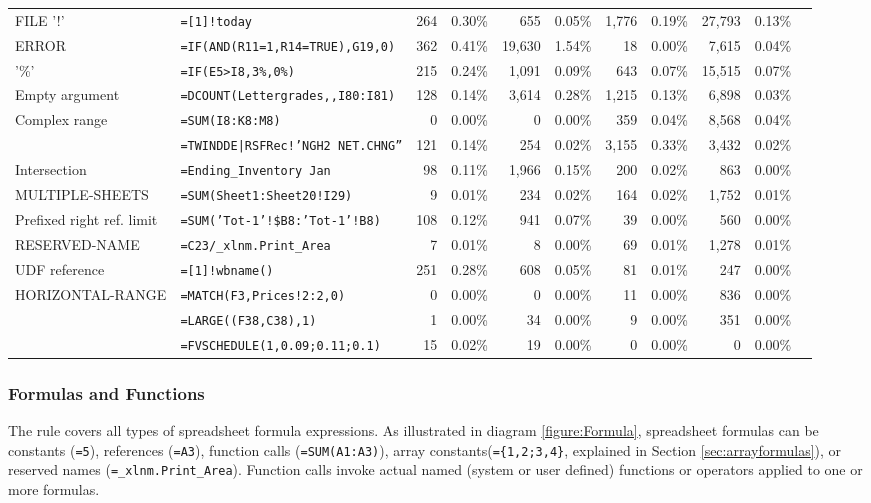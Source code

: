 \documentclass[conference]{IEEEtran}
\begin{document}
\begin{table*}
\begin{tabular}{llrrrrrrrrr}
		FILE '!' & \texttt{=[1]!today} & 264 & 0.30\% & 655 & 0.05\% & 1,776 & 0.19\% & 27,793 & 0.13\%\\
		ERROR & \texttt{=IF(AND(R11=1,R14=TRUE),G19,0)} & 362 & 0.41\% & 19,630 & 1.54\% & 18 & 0.00\% & 7,615 & 0.04\%\\
		'\%' & \texttt{=IF(E5>I8,3\%,0\%)} & 215 & 0.24\% & 1,091 & 0.09\% & 643 & 0.07\% & 15,515 & 0.07\%\\
		Empty argument & \texttt{=DCOUNT(Lettergrades,,I80:I81)} & 128 & 0.14\% & 3,614 & 0.28\% & 1,215 & 0.13\% & 6,898 & 0.03\%\\
		Complex range & \texttt{=SUM(I8:K8:M8)} & 0 & 0.00\% & 0 & 0.00\% & 359 & 0.04\% & 8,568 & 0.04\%\\
		\synt{DynamicDataExchange} & \texttt{=TWINDDE|RSFRec!'NGH2 NET.CHNG''} & 121 & 0.14\% & 254 & 0.02\% & 3,155 & 0.33\% & 3,432 & 0.02\%\\
		Intersection & \texttt{=Ending_Inventory Jan} & 98 & 0.11\% & 1,966 & 0.15\% & 200 & 0.02\% & 863 & 0.00\%\\
		MULTIPLE-SHEETS & \texttt{=SUM(Sheet1:Sheet20!I29)} & 9 & 0.01\% & 234 & 0.02\% & 164 & 0.02\% & 1,752 & 0.01\%\\
		Prefixed right ref. limit & \texttt{=SUM('Tot-1'!\$B8:'Tot-1'!B8)} & 108 & 0.12\% & 941 & 0.07\% & 39 & 0.00\% & 560 & 0.00\%\\
		RESERVED-NAME & \texttt{=C23/_xlnm.Print_Area} & 7 & 0.01\% & 8 & 0.00\% & 69 & 0.01\% & 1,278 & 0.01\%\\
		UDF reference & \texttt{=[1]!wbname()} & 251 & 0.28\% & 608 & 0.05\% & 81 & 0.01\% & 247 & 0.00\%\\
		HORIZONTAL-RANGE & \texttt{=MATCH(F3,Prices!2:2,0)} & 0 & 0.00\% & 0 & 0.00\% & 11 & 0.00\% & 836 & 0.00\%\\
		\synt{Union} & \texttt{=LARGE((F38,C38),1)} & 1 & 0.00\% & 34 & 0.00\% & 9 & 0.00\% & 351 & 0.00\%\\
		\synt{ConstantArray} & \texttt{=FVSCHEDULE(1,{0.09;0.11;0.1})} & 15 & 0.02\% & 19 & 0.00\% & 0 & 0.00\% & 0 & 0.00\%\\
		\hline
		
	\end{tabular}
\end{table*}

\subsubsection{Formulas and Functions}

The  rule covers all types of spreadsheet formula expressions. As illustrated in diagram \ref{figure:Formula}, spreadsheet formulas can be constants (\texttt{=5}), references (\texttt{=A3}), function calls (\texttt{=SUM(A1:A3)}), array constants(\texttt{=\{1,2;3,4\}}, explained in Section \ref{sec:arrayformulas}), or reserved names (\texttt{=_xlnm.Print_Area}). Function calls invoke actual named (system or user defined) functions or operators applied to one or more formulas. 
\end{document}
